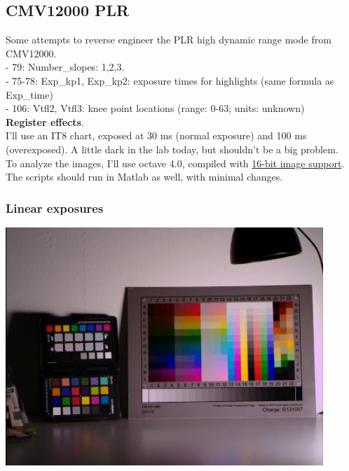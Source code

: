 \subsection{CMV12000 PLR}

Some attempts to reverse engineer the PLR high dynamic range mode from CMV12000.\\ 

- 79: Number\_slopes: 1,2,3.\\
- 75-78: Exp\_kp1, Exp\_kp2: exposure times for highlights (same formula as Exp\_time)\\
- 106: Vtfl2, Vtfl3: knee point locations (range: 0-63; units: unknown) \\


\textbf{Register effects}.\\

I'll use an IT8 chart, exposed at 30 ms (normal exposure) and 100 ms (overexposed). A little dark in the lab today, but shouldn't be a big problem.\\

To analyze the images, I'll use octave 4.0, compiled with \href{http://marcelojoeng.blogspot.co.uk/2012/11/compile-octave-using-1632-bits-colour.html}{16-bit image support}. The scripts should run in Matlab as well, with minimal changes.\\

\subsubsection{Linear exposures}

\begin{center}
\includegraphics[height=9cm]{images/30ms-lin}
\end{center}

